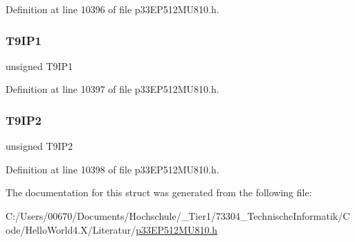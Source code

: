 Definition at line 10396 of file p33\+E\+P512\+M\+U810.\+h.

\mbox{\label{structtag_i_p_c13_b_i_t_s_ab7b34e8310a10ecb1e0e58e679da6494}} 
\subsubsection{\texorpdfstring{T9\+I\+P1}{T9IP1}}
{\footnotesize\ttfamily unsigned T9\+I\+P1}



Definition at line 10397 of file p33\+E\+P512\+M\+U810.\+h.

\mbox{\label{structtag_i_p_c13_b_i_t_s_a3bcf89c1a7980a15e16a80f0cab8e0fc}} 
\subsubsection{\texorpdfstring{T9\+I\+P2}{T9IP2}}
{\footnotesize\ttfamily unsigned T9\+I\+P2}



Definition at line 10398 of file p33\+E\+P512\+M\+U810.\+h.



The documentation for this struct was generated from the following file\+:\begin{DoxyCompactItemize}
\item 
C\+:/\+Users/00670/\+Documents/\+Hochschule/\+\_\+\+Tier1/73304\+\_\+\+Technische\+Informatik/\+Code/\+Hello\+World4.\+X/\+Literatur/\hyperlink{p33_e_p512_m_u810_8h}{p33\+E\+P512\+M\+U810.\+h}\end{DoxyCompactItemize}
